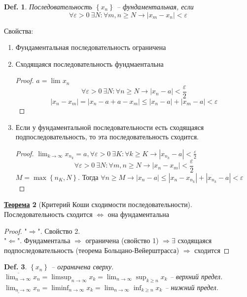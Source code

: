 \documentclass[12pt]{article}
\newenvironment{MyList}[1][4pt]{
  \begin{enumerate}[1.]
  \setlength{\parskip}{0pt}
  \setlength{\itemsep}{#1}
}{       
  \end{enumerate}
}
\def\SO{\Rightarrow}     %
\def\EQ{\Leftrightarrow} %
\theoremstyle{definition} %
\newtheorem{Thm}{\underline{Теорема}}[subsection] %
\theoremstyle{plain} %
\newtheorem{Def}[Thm]{Def.} %
\theoremstyle{remark} %
\begin{document}
\begin{Def}
    Последовательность $\left\{x_n\right\}$ -- фундаментальная, если 
    \[\forall \varepsilon > 0 \ \exists N : \forall m, n \geqslant N \to |x_m - x_n| < \varepsilon\]
\end{Def}

Свойства:
\begin{MyList}
    \item Фундаментальная последовательность ограничена
    \item Сходящаяся последовательность фундмаентальна
    \begin{proof}
        $a = \lim x_n$
        \[\forall \varepsilon > 0 \ \exists N : \forall n \geqslant N \to |x_n - a| < \frac{\varepsilon}{2}\]
        \[|x_n - x_m| = |x_n - a + a - x_m| \leqslant |x_n - a| + |x_m - a| < \varepsilon\]  
    \end{proof}
    \item Если у фундаментальной последовательности есть сходящаяся подпоследовательность, то эта последовательность сходится.
    \begin{proof}
        $\lim_{k \to \infty} x_{n_k} = a, \forall \varepsilon > 0 \ \exists K : \forall k \geqslant K \to |x_{n_k} - a| < \frac{\varepsilon}{2}$ 
        \[\forall \varepsilon > 0 \ \exists N : \forall m, n \geqslant N \to |x_n - x_m| < \frac{\varepsilon}{2}\]
        $M = \max \left\{n_K, N\right\}$. Тогда $\forall n \geqslant M \to |x_n - a| \leqslant |x_n - x_{n_k}| + |x_{n_k} - a| < \varepsilon$ 
    \end{proof}
\end{MyList}

\begin{Thm}[Критерий Коши сходимости последовательности]
    Последовательность сходится $\EQ$ она фундаментальна
\end{Thm}

\begin{proof}
    "$\SO$". Свойство 2. \\
    "$\Leftarrow$". Фундаментальа $\SO$ ограничена (свойство 1) $\SO \exists$ сходящаяся подпоследовательность (теорема Больцано-Вейерштрасса) $\SO$ сходится  
\end{proof}

\begin{Def}
    $\left\{x_n\right\}$ -- ограничена сверху. \\
    $\overline{\lim_{n \to \infty}} x_n = \limsup_{n \to \infty} x_k = \lim_{n \to \infty} \sup_{k \geqslant n} x_k$  -- верхний предел. \\
    $\underline{\lim_{n \to \infty}} x_n = \liminf_{n \to \infty} x_k = \lim_{n \to \infty} \inf_{k \geqslant n} x_k$  -- нижний предел. 
\end{Def} 
\end{document}
